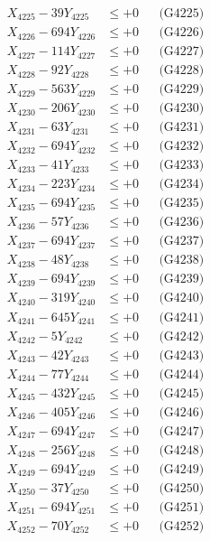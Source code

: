 \documentclass[a4paper,10pt]{article}
\begin{document}
{\begin{align}
X_{4225} - 39Y_{4225} &\leq +0 && \text{(G4225)} \\
X_{4226} - 694Y_{4226} &\leq +0 && \text{(G4226)} \\
X_{4227} - 114Y_{4227} &\leq +0 && \text{(G4227)} \\
X_{4228} - 92Y_{4228} &\leq +0 && \text{(G4228)} \\
X_{4229} - 563Y_{4229} &\leq +0 && \text{(G4229)} \\
X_{4230} - 206Y_{4230} &\leq +0 && \text{(G4230)} \\
\allowbreak
X_{4231} - 63Y_{4231} &\leq +0 && \text{(G4231)} \\
X_{4232} - 694Y_{4232} &\leq +0 && \text{(G4232)} \\
X_{4233} - 41Y_{4233} &\leq +0 && \text{(G4233)} \\
X_{4234} - 223Y_{4234} &\leq +0 && \text{(G4234)} \\
X_{4235} - 694Y_{4235} &\leq +0 && \text{(G4235)} \\
X_{4236} - 57Y_{4236} &\leq +0 && \text{(G4236)} \\
X_{4237} - 694Y_{4237} &\leq +0 && \text{(G4237)} \\
X_{4238} - 48Y_{4238} &\leq +0 && \text{(G4238)} \\
X_{4239} - 694Y_{4239} &\leq +0 && \text{(G4239)} \\
X_{4240} - 319Y_{4240} &\leq +0 && \text{(G4240)} \\
\allowbreak
X_{4241} - 645Y_{4241} &\leq +0 && \text{(G4241)} \\
X_{4242} - 5Y_{4242} &\leq +0 && \text{(G4242)} \\
X_{4243} - 42Y_{4243} &\leq +0 && \text{(G4243)} \\
X_{4244} - 77Y_{4244} &\leq +0 && \text{(G4244)} \\
X_{4245} - 432Y_{4245} &\leq +0 && \text{(G4245)} \\
X_{4246} - 405Y_{4246} &\leq +0 && \text{(G4246)} \\
X_{4247} - 694Y_{4247} &\leq +0 && \text{(G4247)} \\
X_{4248} - 256Y_{4248} &\leq +0 && \text{(G4248)} \\
X_{4249} - 694Y_{4249} &\leq +0 && \text{(G4249)} \\
X_{4250} - 37Y_{4250} &\leq +0 && \text{(G4250)} \\
\allowbreak
X_{4251} - 694Y_{4251} &\leq +0 && \text{(G4251)} \\
X_{4252} - 70Y_{4252} &\leq +0 && \text{(G4252)} \\

\end{align}}
\end{document}
